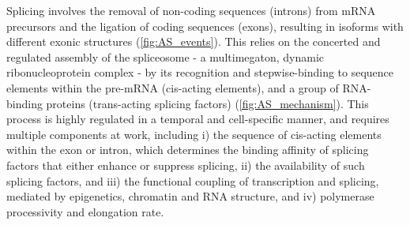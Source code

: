 Splicing involves the removal of non-coding sequences (introns) from mRNA precursors and the ligation of coding sequences (exons), resulting in isoforms with different exonic structures (\cref{fig:AS_events}). This relies on the concerted and regulated assembly of the spliceosome - a multimegaton, dynamic ribonucleoprotein complex - by its recognition and stepwise-binding to sequence elements within the pre-mRNA (cis-acting elements), and a group of RNA-binding proteins (trans-acting splicing factors) (\cref{fig:AS_mechanism}). This process is highly regulated in a temporal and cell-specific manner, and requires multiple components at work, including i) the sequence of cis-acting elements within the exon or intron, which determines the binding affinity of splicing factors that either enhance or suppress splicing, ii) the availability of such splicing factors, and iii) the functional coupling of transcription and splicing, mediated by epigenetics, chromatin and RNA structure, and iv) polymerase processivity and elongation rate.


